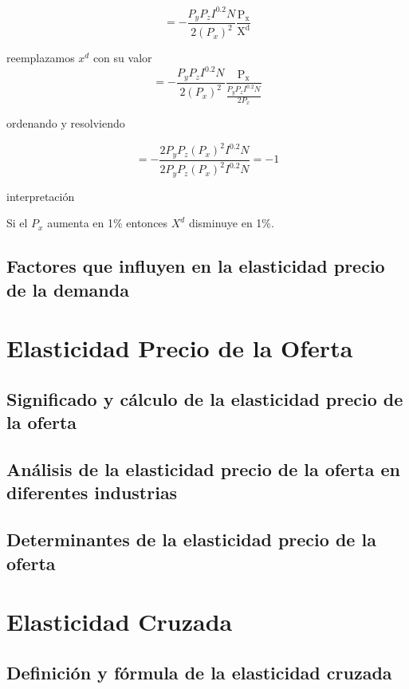 \documentclass[
  a4paper,
]{article}
\begin{document}
\[
= - \frac{P_y P_z I^{0.2} N}{2 (P_x)^2} \frac{\mathrm{P_x}}{\mathrm{X^d} }
\]

reemplazamos \(x^d\) con su valor \[
= - \frac{P_y P_z I^{0.2} N}{2 (P_x)^2} \frac{\mathrm{P_x}}{\frac{P_y P_z I^{0.2} N}{2 P_x} }
\]

ordenando y resolviendo

\[
= - \frac{2 P_y P_z (P_x)^2 I^{0.2} N}{2 P_y P_z (P_x)^2 I^{0.2} N} = -1
\]

interpretación

Si el \(P_x\) aumenta en 1\% entonces \(X^d\) disminuye en 1\%.

\subsection{Factores que influyen en la elasticidad precio de la
demanda}\label{factores-que-influyen-en-la-elasticidad-precio-de-la-demanda}

\section{Elasticidad Precio de la
Oferta}\label{elasticidad-precio-de-la-oferta}

\subsection{Significado y cálculo de la elasticidad precio de la
oferta}\label{significado-y-cuxe1lculo-de-la-elasticidad-precio-de-la-oferta}

\subsection{Análisis de la elasticidad precio de la oferta en diferentes
industrias}\label{anuxe1lisis-de-la-elasticidad-precio-de-la-oferta-en-diferentes-industrias}

\subsection{Determinantes de la elasticidad precio de la
oferta}\label{determinantes-de-la-elasticidad-precio-de-la-oferta}

\section{Elasticidad Cruzada}\label{elasticidad-cruzada}

\subsection{Definición y fórmula de la elasticidad
cruzada}\label{definiciuxf3n-y-fuxf3rmula-de-la-elasticidad-cruzada}
\end{document}
